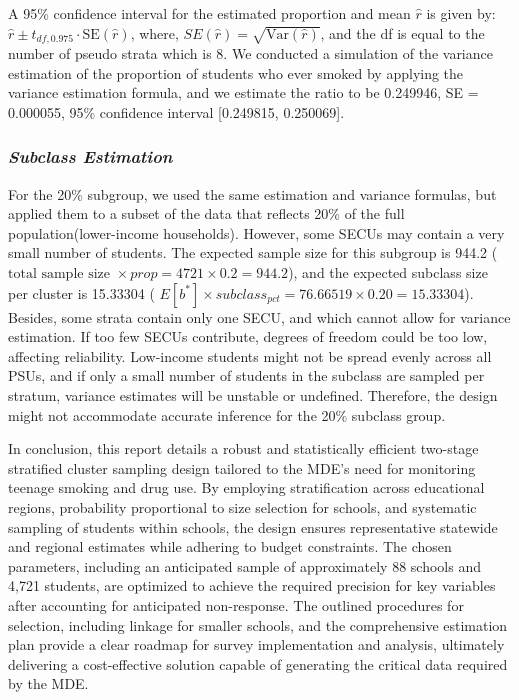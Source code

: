 \documentclass[
  12pt]{article}
\begin{document}
A 95\% confidence interval for the estimated proportion and mean
\(\hat{r}\) is given by:
\(\hat{r} \pm t_{df, 0.975} \cdot \text{SE}(\hat{r})\), where,
\(SE(\hat{r}) = \sqrt{\text{Var}(\hat{r})}\), and the df is equal to the
number of pseudo strata which is 8. We conducted a simulation of the
variance estimation of the proportion of students who ever smoked by
applying the variance estimation formula, and we estimate the ratio to
be 0.249946, SE = 0.000055, 95\% confidence interval {[}0.249815,
0.250069{]}.

\subsubsection{\texorpdfstring{\emph{Subclass
Estimation}}{Subclass Estimation}}\label{subclass-estimation}

For the 20\% subgroup, we used the same estimation and variance
formulas, but applied them to a subset of the data that reflects 20\% of
the full population(lower-income households). However, some SECUs may
contain a very small number of students. The expected sample size for
this subgroup is 944.2
(\(\text{total sample size } \times prop = 4721 \times 0.2 = 944.2\)),
and the expected subclass size per cluster is 15.33304 (
\(E[b^{*}] \times subclass_{pct} = 76.66519 \times 0.20 = 15.33304\)).
Besides, some strata contain only one SECU, and which cannot allow for
variance estimation. If too few SECUs contribute, degrees of freedom
could be too low, affecting reliability. Low-income students might not
be spread evenly across all PSUs, and if only a small number of students
in the subclass are sampled per stratum, variance estimates will be
unstable or undefined. Therefore, the design might not accommodate
accurate inference for the 20\% subclass group.

In conclusion, this report details a robust and statistically efficient
two-stage stratified cluster sampling design tailored to the MDE's need
for monitoring teenage smoking and drug use. By employing stratification
across educational regions, probability proportional to size selection
for schools, and systematic sampling of students within schools, the
design ensures representative statewide and regional estimates while
adhering to budget constraints. The chosen parameters, including an
anticipated sample of approximately 88 schools and 4,721 students, are
optimized to achieve the required precision for key variables after
accounting for anticipated non-response. The outlined procedures for
selection, including linkage for smaller schools, and the comprehensive
estimation plan provide a clear roadmap for survey implementation and
analysis, ultimately delivering a cost-effective solution capable of
generating the critical data required by the MDE.
\end{document}
